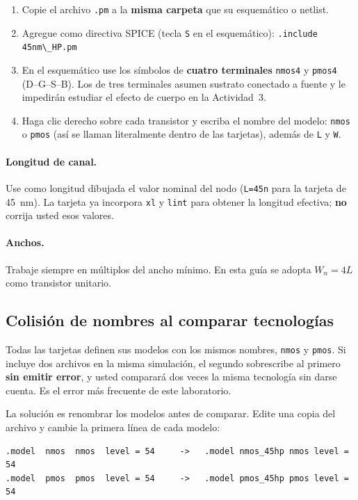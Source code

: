 \documentclass[11pt,a4paper]{article}
\begin{document}
\begin{enumerate}[leftmargin=1.6em,itemsep=0.35em]
  \item Copie el archivo \texttt{.pm} a la \textbf{misma carpeta} que su esquemático o netlist.
  \item Agregue como directiva SPICE (tecla \texttt{S} en el esquemático):
        \lstinline|.include 45nm\_HP.pm|
  \item En el esquemático use los símbolos de \textbf{cuatro terminales} \texttt{nmos4} y \texttt{pmos4} (D--G--S--B). Los de tres terminales asumen sustrato conectado a fuente y le impedirán estudiar el efecto de cuerpo en la Actividad~3.
  \item Haga clic derecho sobre cada transistor y escriba el nombre del modelo: \texttt{nmos} o \texttt{pmos} (así se llaman literalmente dentro de las tarjetas), además de \texttt{L} y \texttt{W}.
\end{enumerate}

\paragraph{Longitud de canal.} Use como longitud dibujada el valor nominal del nodo (\texttt{L=45n} para la tarjeta de 45~nm). La tarjeta ya incorpora \texttt{xl} y \texttt{lint} para obtener la longitud efectiva; \textbf{no} corrija usted esos valores.

\paragraph{Anchos.} Trabaje siempre en múltiplos del ancho mínimo. En esta guía se adopta $W_n = 4L$ como transistor unitario.

\subsection{Colisión de nombres al comparar tecnologías}
\label{sec:colision}

Todas las tarjetas definen sus modelos con los mismos nombres, \texttt{nmos} y \texttt{pmos}. Si incluye dos archivos en la misma simulación, el segundo sobrescribe al primero \textbf{sin emitir error}, y usted comparará dos veces la misma tecnología sin darse cuenta. Es el error más frecuente de este laboratorio.

La solución es renombrar los modelos antes de comparar. Edite una copia del archivo y cambie la primera línea de cada modelo:

\begin{lstlisting}
.model  nmos  nmos  level = 54     ->   .model nmos_45hp nmos level = 54
.model  pmos  pmos  level = 54     ->   .model pmos_45hp pmos level = 54
\end{lstlisting}
\end{document}
